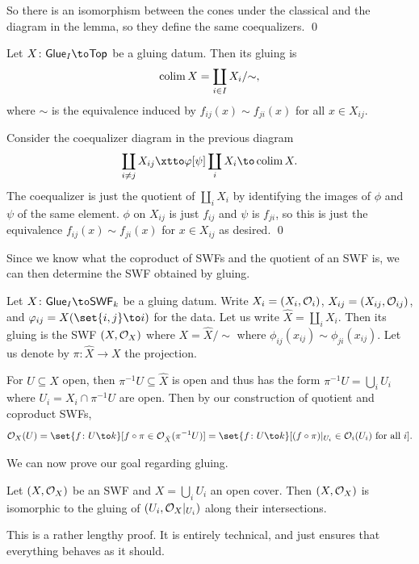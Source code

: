     So there is an isomorphism between the cones under the classical and the diagram in the lemma, so they define the same coequalizers.
    \qed

\eproof

\blemm

    Let $X\colon\glue_I\to\Top$ be a gluing datum.
    Then its gluing is
    $$ \mathop{\rm colim}\limits X = \coprod_{i\in I}X_i/{\sim} , $$
    where $\sim$ is the equivalence induced by $f_{ij}(x)\sim f_{ji}(x)$ for all $x\in X_{ij}$.

\elemm

\bproof

    Consider the coequalizer diagram in the previous diagram
    $$ \coprod_{i\neq j}X_{ij} \xtto\phi[\psi] \coprod_iX_i \to \colim X . $$
    The coequalizer is just the quotient of $\coprod_iX_i$ by identifying the images of $\phi$ and $\psi$ of the same element.
    $\phi$ on $X_{ij}$ is just $f_{ij}$ and $\psi$ is $f_{ji}$, so this is just the equivalence $f_{ij}(x)\sim f_{ji}(x)$ for $x\in X_{ij}$ as desired.
    \qed

\eproof

Since we know what the coproduct of SWFs and the quotient of an SWF is, we can then determine the SWF obtained by gluing.

Let $X\colon\glue_I\to\SWF_k$ be a gluing datum.
Write $X_i=(X_i,{{\cal O}}_i)$, $X_{ij}=(X_{ij},{{\cal O}}_{ij})$, and $\phi_{ij}=X(\set{i,j}\to i)$ for the data.
Let us write $\hat X=\coprod_iX_i$.
Then its gluing is the SWF $(X,{{\cal O}}_X)$ where $X=\hat X/{\sim}$ where $\phi_{ij}(x_{ij})\sim\phi_{ji}(x_{ij})$.
Let us denote by $\pi\colon\hat X\to X$ the projection.

For $U\subseteq X$ open, then $\pi^{-1}U\subseteq\hat X$ is open and thus has the form $\pi^{-1}U=\bigcup_iU_i$ where $U_i=X_i\cap\pi^{-1}U$ are open.
Then by our construction of quotient and coproduct SWFs,
$$ \O_X(U) = \set{f\colon U\to k}[f\circ\pi\in\O_{\hat X}(\pi^{-1}U)] = \set{f\colon U\to k}[(f\circ\pi)|_{U_i}\in\O_i(U_i)\hbox{ for all $i$}] . $$

We can now prove our goal regarding gluing.

\bthrm

    Let $(X,{{\cal O}}_X)$ be an SWF and $X=\bigcup_iU_i$ an open cover.
    Then $(X,{{\cal O}}_X)$ is isomorphic to the gluing of $(U_i,{{\cal O}}_X|_{U_i})$ along their intersections.

\ethrm

\bproof

    This is a rather lengthy proof.
    It is entirely technical, and just ensures that everything behaves as it should.

